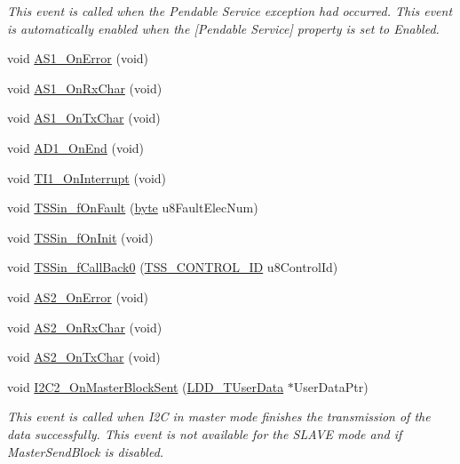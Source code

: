 \begin{DoxyCompactItemize}
\begin{DoxyCompactList}\small\item\em This event is called when the Pendable Service exception had occurred. This event is automatically enabled when the \mbox{[}Pendable Service\mbox{]} property is set to \textquotesingle{}Enabled\textquotesingle{}. \end{DoxyCompactList}\item 
void \hyperlink{group___events__module_ga29fa5834e7c66a52898789186851847d}{A\+S1\+\_\+\+On\+Error} (void)
\item 
void \hyperlink{group___events__module_gac72aa34766c66a614f29b1267cadfccc}{A\+S1\+\_\+\+On\+Rx\+Char} (void)
\item 
void \hyperlink{group___events__module_gad4ca2c06cb7fdb57a52811247371565c}{A\+S1\+\_\+\+On\+Tx\+Char} (void)
\item 
void \hyperlink{group___events__module_gac0b0e33c722d75df2e7b6eb1d50f15a7}{A\+D1\+\_\+\+On\+End} (void)
\item 
void \hyperlink{group___events__module_ga01b566cf25a21b34152513dcb1321a11}{T\+I1\+\_\+\+On\+Interrupt} (void)
\item 
void \hyperlink{group___events__module_gaaade020d27159f2102fb3b994d1224ae}{T\+S\+Sin\+\_\+f\+On\+Fault} (\hyperlink{group___p_e___types__module_ga0c8186d9b9b7880309c27230bbb5e69d}{byte} u8\+Fault\+Elec\+Num)
\item 
void \hyperlink{group___events__module_ga67e29a27a74c8a25e4edddb84351a138}{T\+S\+Sin\+\_\+f\+On\+Init} (void)
\item 
void \hyperlink{group___events__module_ga5969b4c9b3e47d79941c612897503fe4}{T\+S\+Sin\+\_\+f\+Call\+Back0} (\hyperlink{struct_t_s_s___c_o_n_t_r_o_l___i_d}{T\+S\+S\+\_\+\+C\+O\+N\+T\+R\+O\+L\+\_\+\+ID} u8\+Control\+Id)
\item 
void \hyperlink{group___events__module_ga0137853d241c656b6bf6653ebfc64cac}{A\+S2\+\_\+\+On\+Error} (void)
\item 
void \hyperlink{group___events__module_gadc4e66d9db0a63b063b37ad5a70a10be}{A\+S2\+\_\+\+On\+Rx\+Char} (void)
\item 
void \hyperlink{group___events__module_ga745f5ad3a73381f935cc2ee2fec5c34f}{A\+S2\+\_\+\+On\+Tx\+Char} (void)
\item 
void \hyperlink{group___events__module_ga23f378d5253016b341bf971cb5c35ee7}{I2\+C2\+\_\+\+On\+Master\+Block\+Sent} (\hyperlink{group___p_e___types__module_ga0b66a73f87238a782318aa0be7578e35}{L\+D\+D\+\_\+\+T\+User\+Data} $\ast$User\+Data\+Ptr)
\begin{DoxyCompactList}\small\item\em This event is called when I2C in master mode finishes the transmission of the data successfully. This event is not available for the S\+L\+A\+VE mode and if Master\+Send\+Block is disabled. \end{DoxyCompactList}\item 

\end{DoxyCompactItemize}
